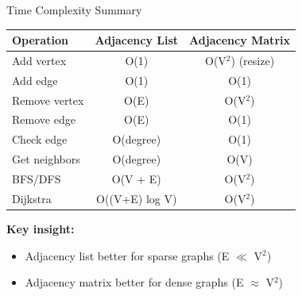 \documentclass[aspectratio=169]{beamer}
\begin{document}
\begin{frame}{Time Complexity Summary}
  \begin{table}
    \centering
    \small
    \begin{tabular}{|l|c|c|}
      \hline
      \textbf{Operation} & \textbf{Adjacency List} & \textbf{Adjacency Matrix} \\
      \hline
      Add vertex & O(1) & O(V$^2$) (resize) \\
      \hline
      Add edge & O(1) & O(1) \\
      \hline
      Remove vertex & O(E) & O(V$^2$) \\
      \hline
      Remove edge & O(E) & O(1) \\
      \hline
      Check edge & O(degree) & O(1) \\
      \hline
      Get neighbors & O(degree) & O(V) \\
      \hline
      BFS/DFS & O(V + E) & O(V$^2$) \\
      \hline
      Dijkstra & O((V+E) log V) & O(V$^2$) \\
      \hline
    \end{tabular}
  \end{table}

  \vspace{0.3cm}
  \textbf{Key insight:}
  \begin{itemize}
    \item Adjacency list better for sparse graphs (E $\ll$ V$^2$)
    \item Adjacency matrix better for dense graphs (E $\approx$ V$^2$)
  \end{itemize}
\end{frame}
\end{document}
